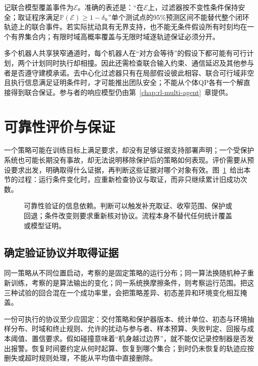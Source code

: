 记联合模型覆盖事件为$\mathcal E$。准确的表述是：“在$\mathcal E$上，过滤器按不变性条件保持安全；取证程序满足$\mathbb P(\mathcal E)\geq1-\delta$。”单个测试点的95\%预测区间不能替代整个闭环轨迹上的联合事件。若实际扰动具有无界支持，也不能无条件假设所有时刻均在一个有界集合内；有限时域高概率覆盖与无限时域逐轨迹保证必须分开。

多个机器人共享狭窄通道时，每个机器人在“对方会等待”的假设下都可能有可行计划，两个计划同时执行却相撞。因此还需检查联合输入约束、通信延迟及其他参与者是否遵守建模承诺。去中心化过滤器只有在局部假设彼此相容、联合可行域非空且执行信息满足证明条件时，才可能推出团队安全；不能从个体QP各有一个解直接得到联合保证。参与者的响应模型仍由第~\ref{chap:rl-multi-agent}~章提供。

\section{可靠性评价与保证}
\label{sec:rl-trustworthy-evidence}

一个策略可能在训练目标上满足要求，却没有足够证据支持部署声明；一个受保护系统也可能长期没有事故，却无法说明移除保护后的策略如何表现。评价需要从预设要求出发，明确取得什么证据，再判断这些证据对哪个对象有效。图~\ref{fig:rl-trustworthy-validation}~给出本节的过程：运行条件变化时，应重新检查协议与取证，而非只继续累计旧成功次数。

\begin{figure}[t]
  \centering
  
  \caption{可靠性验证的信息依赖。判断可以触发补充取证、收窄范围、保护或回退；条件改变则要求重新核对协议。流程本身不替代任何统计覆盖或模型证明。}
  \label{fig:rl-trustworthy-validation}
\end{figure}

\subsection{确定验证协议并取得证据}
\label{sec:rl-trustworthy-protocol}

同一策略从不同位置启动，考察的是固定策略的运行分布；同一算法换随机种子重新训练，考察的是算法输出的变化；同一系统换摩擦条件，则考察运行范围。把这三种试验的回合混在一个成功率里，会把策略差异、初态差异和环境变化相互掩盖。

一份可执行的协议至少应固定：交付策略和保护器版本、统计单位、初态与环境抽样分布、时域和终止规则、允许的扰动与参与者、样本预算、失败判定、回报与成本阈值、置信要求。假如碰撞意味着“机身越过边界”，就不能仅记录控制器是否发出报警。恢复时间要约定从何时起算、恢复到哪个集合；到时仍未恢复的轨迹应按删失或超时规则处理，不能从平均值中直接删除。

